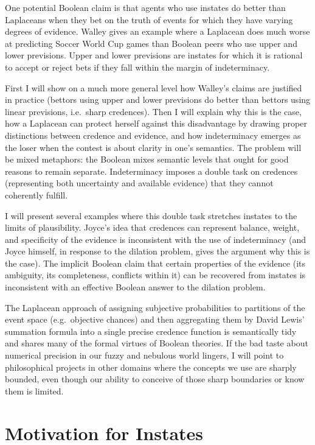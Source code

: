 \documentclass[11pt]{article}
\begin{document}
One potential Boolean claim is that agents who use instates do better than Laplaceans when they bet on the truth of events for which they have varying degrees of evidence. Walley gives an example where a Laplacean does much worse at predicting Soccer World Cup games than Boolean peers who use upper and lower previsions. Upper and lower previsions are instates for which it is rational to accept or reject bets if they fall within the margin of indeterminacy. 

First I will show on a much more general level how Walley's claims are justified in practice (bettors using upper and lower previsions do better than bettors using linear previsions, i.e.\ sharp credences). Then I will explain why this is the case, how a Laplacean can protect herself against this disadvantage by drawing proper distinctions between credence and evidence, and how indeterminacy emerges as the loser when the contest is about clarity in one's semantics. The problem will be mixed metaphors: the Boolean mixes semantic levels that ought for good reasons to remain separate. Indeterminacy imposes a double task on credences (representing both uncertainty and available evidence) that they cannot coherently fulfill.

I will present several examples where this double task stretches instates to the limits of plausibility. Joyce's idea that credences can represent balance, weight, and specificity of the evidence is inconsistent with the use of indeterminacy (and Joyce himself, in response to the dilation problem, gives the argument why this is the case). The implicit Boolean claim that certain properties of the evidence (its ambiguity, its completeness, conflicts within it) can be recovered from instates is inconsistent with an effective Boolean answer to the dilation problem.

The Laplacean approach of assigning subjective probabilities to partitions of the event space (e.g.\ objective chances) and then aggregating them by David Lewis' summation formula into a single precise credence function is semantically tidy and shares many of the formal virtues of Boolean theories. If the bad taste about numerical precision in our fuzzy and nebulous world lingers, I will point to philosophical projects in other domains where the concepts we use are sharply bounded, even though our ability to conceive of those sharp boundaries or know them is limited.

\section{Motivation for Instates}
\label{MotivationForIndeterminateCredalStates}
\end{document}

